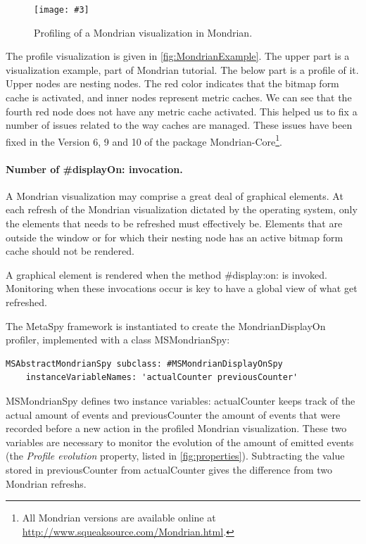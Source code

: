 \documentclass[runningheads]{llncs}
\newcommand{\project}{{\sc MetaSpy}\xspace}
\newcommand{\fig}[4]{
	\begin{figure}[#1]
		\centering
		\texttt{[image: \#3]}
		\caption{\label{fig:#3}#4}
	\end{figure}}
\newcommand{\co}[1]{{\sf #1}}
\begin{document}
\fig{}{.8}{MondrianExample}{Profiling of a Mondrian visualization in Mondrian.}

The profile visualization is given in \autoref{fig:MondrianExample}. The upper part is a visualization example, part of Mondrian tutorial. The below part is a profile of it. Upper nodes are nesting nodes. The red color indicates that the bitmap form cache is activated, and inner nodes represent metric caches. We can see that the fourth red node does not have any metric cache activated. This helped us to fix a number of issues related to the way caches are managed. These issues have been fixed in the Version 6, 9 and 10 of the package Mondrian-Core\footnote{All Mondrian versions are available online at \url{http://www.squeaksource.com/Mondrian.html}.}.


\paragraph{Number of \co{\#displayOn:} invocation.}
A Mondrian visualization may comprise a great deal of graphical elements. At each refresh of the Mondrian visualization dictated by the operating system, only the elements that needs to be refreshed must effectively be. Elements that are outside the window or for which their nesting node has an active bitmap form cache should not be rendered. 

A graphical element is rendered when the method \co{\#display:on:} is invoked. Monitoring when these invocations occur is key to have a global view of what get refreshed. 

The \project framework is instantiated to create the {\sc MondrianDisplayOn} profiler, implemented with a class \co{\sf MSMondrianSpy}:

\begin{lstlisting}
MSAbstractMondrianSpy subclass: #MSMondrianDisplayOnSpy
	instanceVariableNames: 'actualCounter previousCounter'
\end{lstlisting}

{\sf MSMondrianSpy} defines two instance variables: {\sf actualCounter} keeps track of the actual amount of events and {\sf previousCounter} the amount of events that were recorded before a new action in the profiled Mondrian visualization. These two variables are necessary to monitor the evolution of the amount of emitted events (the \emph{Profile evolution} property, listed in \autoref{fig:properties}). Subtracting the value stored in {\sf previousCounter} from {\sf actualCounter} gives the difference from two Mondrian refreshs.
\end{document}
